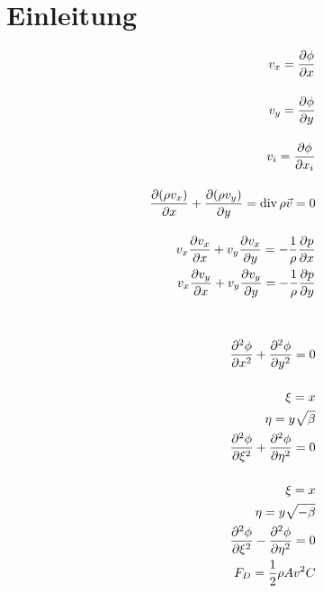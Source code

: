 %
%
%
%
\section{Einleitung\label{ueberschall:Einleitung}}
\begin{align}
    v_x = \frac{\partial \phi}{\partial x}\\
    \intertext{}
    v_y = \frac{\partial \phi}{\partial y}\\
    \intertext{}
    v_i = \frac{\partial\phi}{\partial x_i}\\
    \intertext{}
    \frac{\partial (\rho v_x)}{\partial x} + \frac{\partial (\rho v_y)}{\partial y} = \mathrm{div}\,\rho \vec{v} = 0\\
    \intertext{}
    v_x \frac{\partial v_x}{\partial x} + v_y \frac{\partial v_x}{\partial y} = -\frac{1}{\rho} \frac{\partial p}{\partial x}\\
    v_x \frac{\partial v_y}{\partial x} + v_y \frac{\partial v_y}{\partial y} = -\frac{1}{\rho} \frac{\partial p}{\partial y}\\
    \intertext{}
    \intertext{}
    \frac{\partial^2 \phi}{\partial x^2} + \frac{\partial^2 \phi}{\partial y^2} = 0\\
    \intertext{}
    \xi = x\\
    \eta = y \sqrt{\beta}\\
    \frac{\partial^2 \phi}{\partial \xi^2} + \frac{\partial^2 \phi}{\partial \eta^2} = 0\\
    \intertext{}
    \xi = x\\
    \eta = y \sqrt{-\beta}\\
    \frac{\partial^2 \phi}{\partial \xi^2} - \frac{\partial^2 \phi}{\partial \eta^2} = 0\\
    F_D = \frac{1}{2} \rho A v^2 C
\end{align}
